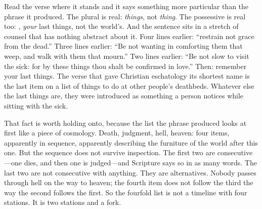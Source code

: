Read the verse where it stands and it says something more particular than the phrase it produced. The plural is real: \emph{things}, not \emph{thing}. The possessive is real too: , \emph{your} last things, not the world's. And the sentence sits in a stretch of counsel that has nothing abstract about it. Four lines earlier: ``restrain not grace from the dead.'' Three lines earlier: ``Be not wanting in comforting them that weep, and walk with them that mourn.'' Two lines earlier: ``Be not slow to visit the sick: for by these things thou shalt be confirmed in love.'' Then: remember your last things. The verse that gave Christian eschatology its shortest name is the last item on a list of things to do at other people's deathbeds. Whatever else the last things are, they were introduced as something a person notices while sitting with the sick.

That fact is worth holding onto, because the list the phrase produced looks at first like a piece of cosmology. Death, judgment, hell, heaven: four items, apparently in sequence, apparently describing the furniture of the world after this one. But the sequence does not survive inspection. The first two are consecutive---one dies, and then one is judged---and Scripture says so in as many words. The last two are not consecutive with anything. They are alternatives. Nobody passes through hell on the way to heaven; the fourth item does not follow the third the way the second follows the first. So the fourfold list is not a timeline with four stations. It is two stations and a fork.

